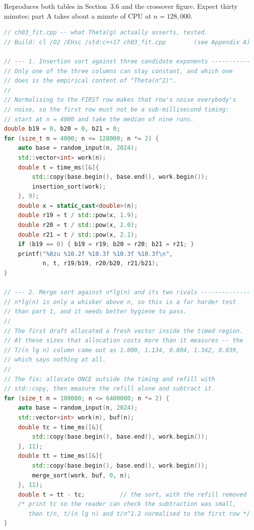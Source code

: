 \begin{lab}
Reproduces both tables in Section~3.6 and the crossover figure. Expect
thirty minutes; part A takes about a minute of CPU at $n = 128{,}000$.

\begin{lstlisting}[language=C++]
// ch03_fit.cpp -- what Theta(g) actually asserts, tested.
// Build: cl /O2 /EHsc /std:c++17 ch03_fit.cpp        (see Appendix A)

// --- 1. Insertion sort against three candidate exponents -----------
// Only one of the three columns can stay constant, and which one
// does is the empirical content of "Theta(n^2)".
//
// Normalising to the FIRST row makes that row's noise everybody's
// noise, so the first row must not be a sub-millisecond timing:
// start at n = 4000 and take the median of nine runs.
double b19 = 0, b20 = 0, b21 = 0;
for (size_t n = 4000; n <= 128000; n *= 2) {
    auto base = random_input(n, 2024);
    std::vector<int> work(n);
    double t = time_ms([&]{
        std::copy(base.begin(), base.end(), work.begin());
        insertion_sort(work);
    }, 9);
    double x = static_cast<double>(n);
    double r19 = t / std::pow(x, 1.9);
    double r20 = t / std::pow(x, 2.0);
    double r21 = t / std::pow(x, 2.1);
    if (b19 == 0) { b19 = r19; b20 = r20; b21 = r21; }
    printf("%8zu %10.2f %10.3f %10.3f %10.3f\n",
           n, t, r19/b19, r20/b20, r21/b21);
}

// --- 2. Merge sort against n*lg(n) and its two rivals --------------
// n*lg(n) is only a whisker above n, so this is a far harder test
// than part 1, and it needs better hygiene to pass.
//
// The first draft allocated a fresh vector inside the timed region.
// At these sizes that allocation costs more than it measures -- the
// T/(n lg n) column came out as 1.000, 1.134, 0.804, 1.342, 0.839,
// which says nothing at all.
//
// The fix: allocate ONCE outside the timing and refill with
// std::copy, then measure the refill alone and subtract it.
for (size_t n = 100000; n <= 6400000; n *= 2) {
    auto base = random_input(n, 2024);
    std::vector<int> work(n), buf(n);
    double tc = time_ms([&]{
        std::copy(base.begin(), base.end(), work.begin());
    }, 11);
    double tt = time_ms([&]{
        std::copy(base.begin(), base.end(), work.begin());
        merge_sort(work, buf, 0, n);
    }, 11);
    double t = tt - tc;          // the sort, with the refill removed
    /* print tc so the reader can check the subtraction was small,
       then t/n, t/(n lg n) and t/n^1.2 normalised to the first row */
}


\end{lstlisting}
\end{lab}

